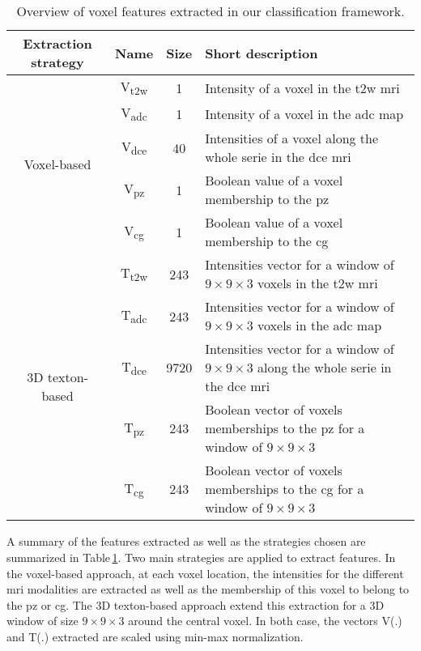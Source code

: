 \begin{table}[h]
\caption{Overview of voxel features extracted in our classification framework.} 
\label{tab:feat}
\renewcommand{\arraystretch}{1.3}
\begin{center}       
\begin{tabular}{c|c|c|p{9cm}} %
\hline
Extraction strategy & Name & Size & Short description  \\
\hline
\hline
\multirow{5}{*}{Voxel-based} & V\textsubscript{\ac{t2w}} & 1 & Intensity of a voxel in the \ac{t2w} \ac{mri} \\
 & V\textsubscript{\ac{adc}} & 1 & Intensity of a voxel in the \ac{adc} map  \\
 & V\textsubscript{\ac{dce}} & 40 & Intensities of a voxel along the whole serie in the \ac{dce} \ac{mri}  \\
 & V\textsubscript{\ac{pz}} & 1 & Boolean value of a voxel membership to the \ac{pz} \\
 & V\textsubscript{\ac{cg}} & 1 & Boolean value of a voxel membership to the \ac{cg} \\ 
\hline
\hline
\multirow{5}{*}{3D texton-based} & T\textsubscript{\ac{t2w}} & 243 & Intensities vector for a window of $9 \times 9 \times 3$ voxels in the \ac{t2w} \ac{mri} \\
 & T\textsubscript{\ac{adc}} & 243 & Intensities vector for a window of $9 \times 9 \times 3$ voxels in the \ac{adc} map \\
 & T\textsubscript{\ac{dce}} & 9720 & Intensities vector for a window of $9 \times 9 \times 3$ along the whole serie in the \ac{dce} \ac{mri} \\
 & T\textsubscript{\ac{pz}} & 243 & Boolean vector of voxels memberships to the \ac{pz} for a window of $9 \times 9 \times 3$ \\
 & T\textsubscript{\ac{cg}} & 243 & Boolean vector of voxels memberships to the \ac{cg} for a window of $9 \times 9 \times 3$ \\
\hline 
\end{tabular}
\end{center}
\end{table}

A summary of the features extracted as well as the strategies chosen are summarized in Table\,\ref{tab:feat}. Two main strategies are applied to extract features. In the voxel-based approach, at each voxel location, the intensities for the different \ac{mri} modalities are extracted as well as the membership of this voxel to belong to the \ac{pz} or \ac{cg}. The 3D texton-based approach extend this extraction for a 3D window of size $9 \times 9 \times 3$ around the central voxel. In both case, the vectors V(.) and T(.) extracted are scaled using min-max normalization.


